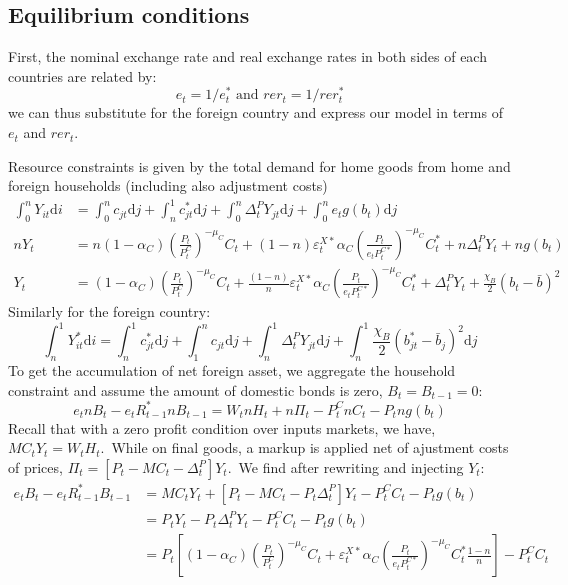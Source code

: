 \documentclass[a4paper,12pt]{article}%
\begin{document}
\subsection{Equilibrium conditions}

First, the nominal exchange rate and real exchange rates in both sides of each
countries are related by:%
\[
e_{t}=1/e_{t}^{\ast}\text{ \ and \ }rer_{t}=1/rer_{t}^{\ast}%
\]
we can thus substitute for the foreign country and express our model in terms
of $e_{t}$ and $rer_{t}$.

Resource constraints is given by the total demand for home goods from home and
foreign households (including also adjustment costs)%
\begin{align}
\int_{0}^{n}Y_{it}\text{d}i &  =\int_{0}^{n}c_{jt}\text{d}j+\int_{n}^{1}%
c_{jt}^{\ast}\text{d}j+\int_{0}^{n}\Delta_{t}^{P}Y_{jt}\text{d}j+\int_{0}%
^{n}e_{t}g\left(  b_{t}\right)  \text{d}j\\
nY_{t} &  =n\left(  1-\alpha_{C}\right)  \left(  \frac{P_{t}}{P_{t}^{C}%
}\right)  ^{-\mu_{C}}C_{t}+\left(  1-n\right)  \varepsilon_{t}^{X\ast}%
\alpha_{C}\left(  \frac{P_{t}}{e_{t}P_{t}^{C\ast}}\right)  ^{-\mu_{C}}%
C_{t}^{\ast}+n\Delta_{t}^{P}Y_{t}+ng\left(  b_{t}\right)  \\
Y_{t} &  =\left(  1-\alpha_{C}\right)  \left(  \frac{P_{t}}{P_{t}^{C}}\right)
^{-\mu_{C}}C_{t}+\frac{\left(  1-n\right)  }{n}\varepsilon_{t}^{X\ast}%
\alpha_{C}\left(  \frac{P_{t}}{e_{t}P_{t}^{C\ast}}\right)  ^{-\mu_{C}}%
C_{t}^{\ast}+\Delta_{t}^{P}Y_{t}+\frac{\chi_{B}}{2}\left(  b_{t}-\bar
{b}\right)  ^{2}%
\end{align}
Similarly for the foreign country:%
\[
\int_{n}^{1}Y_{it}^{\ast}\text{d}i=\int_{n}^{1}c_{jt}^{\ast}\text{d}j+\int
_{1}^{n}c_{jt}\text{d}j+\int_{n}^{1}\Delta_{t}^{P}Y_{jt}\text{d}j+\int_{n}%
^{1}\frac{\chi_{B}}{2}\left(  b_{jt}^{\ast}-\bar{b}_{j}\right)  ^{2}\text{d}j
\]
To get the accumulation of net foreign asset, we aggregate the household
constraint and assume the amount of domestic bonds is zero, $B_{t}=B_{t-1}%
=0$:
\[
e_{t}nB_{t}-e_{t}R_{t-1}^{\ast}nB_{t-1}=W_{t}nH_{t}+n\Pi_{t}-P_{t}^{C}%
nC_{t}-P_{t}ng\left(  b_{t}\right)
\]
Recall that with a zero profit condition over inputs markets, we have,
$MC_{t}Y_{t}=W_{t}H_{t}$.\ While on final goods, a markup is applied net of
ajustment costs of prices, $\Pi_{t}=\left[  P_{t}-MC_{t}-\Delta_{t}%
^{P}\right]  Y_{t}$.\ We find after rewriting and injecting $Y_{t}$:%
\begin{align*}
e_{t}B_{t}-e_{t}R_{t-1}^{\ast}B_{t-1} &  =MC_{t}Y_{t}+\left[  P_{t}%
-MC_{t}-P_{t}\Delta_{t}^{P}\right]  Y_{t}-P_{t}^{C}C_{t}-P_{t}g\left(
b_{t}\right)  \\
&  =P_{t}Y_{t}-P_{t}\Delta_{t}^{P}Y_{t}-P_{t}^{C}C_{t}-P_{t}g\left(
b_{t}\right)  \\
&  =P_{t}\left[  \left(  1-\alpha_{C}\right)  \left(  \frac{P_{t}}{P_{t}^{C}%
}\right)  ^{-\mu_{C}}C_{t}+\varepsilon_{t}^{X\ast}\alpha_{C}\left(
\frac{P_{t}}{e_{t}P_{t}^{C\ast}}\right)  ^{-\mu_{C}}C_{t}^{\ast}\frac{1-n}%
{n}\right]  -P_{t}^{C}C_{t}%
\end{align*}
\end{document}
